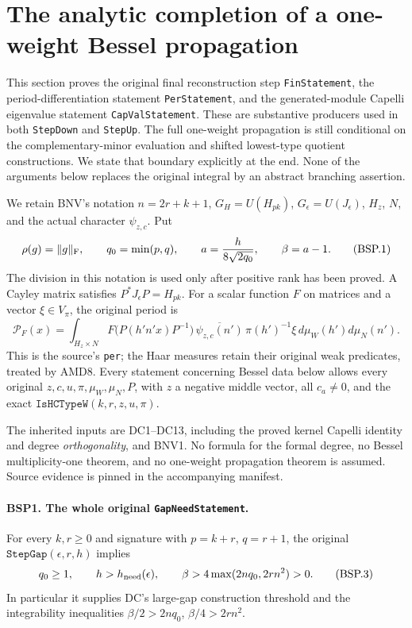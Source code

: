 \section{The analytic completion of a one-weight Bessel propagation}
\label{sec:bessel-weight-propagation-v50}

This section proves the original final reconstruction step
\texttt{FinStatement}, the period-differentiation statement
\texttt{PerStatement}, and the generated-module Capelli eigenvalue statement
\texttt{CapValStatement}.  These are substantive producers used in both
\texttt{StepDown} and \texttt{StepUp}.  The full one-weight propagation is
still conditional on the complementary-minor evaluation and shifted
lowest-type quotient constructions.  We state that boundary explicitly
at the end.  None of the arguments below replaces the original integral
by an abstract branching assertion.

We retain BNV's notation $n=2r+k+1$, $G_H=U(H_{pk})$,
$G_\epsilon=U(J_\epsilon)$, $H_z$, $N$, and the actual character
$\psi_{z,c}$.  Put
\[
 \rho(g)=\|g\|_{\rm F},\qquad
 q_0=\min(p,q),\qquad
 a=\frac{h}{8\sqrt{2q_0}},\qquad \beta=a-1.
 \tag{BSP.1}
\]
The division in this notation is used only after positive rank has been
proved.  A Cayley matrix satisfies $P^*J_\epsilon P=H_{pk}$.
For a scalar function $F$ on matrices and a vector $\xi\in V_\pi$, the
original period is
\[
 \mathcal P_F(x)=
 \int_{H_z\times N}
 F\bigl(P(h'n'x)P^{-1}\bigr)\,
 \overline{\psi_{z,c}(n')}\,\pi(h')^{-1}\xi\,
 d\mu_W(h')d\mu_N(n').
 \tag{BSP.2}
\]
This is the source's \texttt{per}; the Haar measures retain their original
weak predicates, treated by AMD8.  Every statement concerning Bessel data
below allows every original $z,c,u,\pi,\mu_W,\mu_N,P$, with
$z$ a negative middle vector, all $c_a\ne0$, and the exact
$\texttt{IsHCTypeW}(k,r,z,u,\pi)$.

The inherited inputs are DC1--DC13, including the proved kernel Capelli
identity and degree \emph{orthogonality}, and BNV1.  No formula for the
formal degree, no Bessel multiplicity-one theorem, and no one-weight
propagation theorem is assumed.  Source evidence is pinned in the
accompanying manifest.

\paragraph{BSP1. The whole original \texttt{GapNeedStatement}.}
\label{claim:BSP1}
For every $k,r\ge0$ and signature with $p=k+r$, $q=r+1$, the original
$\texttt{StepGap}(\epsilon,r,h)$ implies
\[
 q_0\ge1,\qquad h>h_{\rm need}(\epsilon),\qquad
 \beta>4\max(2nq_0,2rn^2)>0.
 \tag{BSP.3}
\]
In particular it supplies DC's large-gap construction threshold and the
integrability inequalities $\beta/2>2nq_0$, $\beta/4>2rn^2$.

